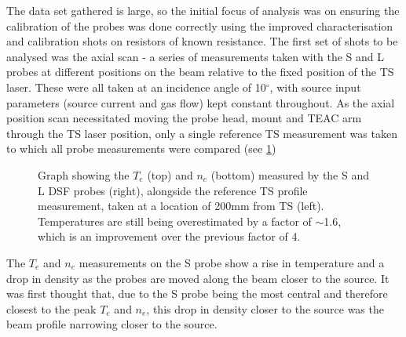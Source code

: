 \documentclass[a4paper, 12pt]{article} %
\begin{document}
	The data set gathered is large, so the initial focus of analysis was on ensuring the calibration of the probes was done correctly using the improved characterisation and calibration shots on resistors of known resistance. 
	The first set of shots to be analysed was the axial scan - a series of measurements taken with the S and L probes at different positions on the beam relative to the fixed position of the TS laser. 
	These were all taken at an incidence angle of 10$^{\circ}$, with source input parameters (source current and gas flow) kept constant throughout. 
	As the axial position scan necessitated moving the probe head, mount and TEAC arm through the TS laser position, only a single reference TS measurement was taken to which all probe measurements were compared (see \cref{fig:mag-axial-scan})
	\begin{figure}[!tb]
		\vspace{-20pt}
		\caption{
			Graph showing the $T_e$ (top) and $n_e$ (bottom) measured by the S and L DSF probes (right), alongside the reference TS profile measurement, taken at a location of 200mm from TS (left).
			Temperatures are still being overestimated by a factor of $\sim$1.6, which is an improvement over the previous factor of 4. 
			}
		\label{fig:mag-axial-scan}
		\vspace{-10pt}
	\end{figure}
	The $T_e$ and $n_e$ measurements on the S probe show a rise in temperature and a drop in density as the probes are moved along the beam closer to the source. 
	It was first thought that, due to the S probe being the most central and therefore closest to the peak $T_e$ and $n_e$, this drop in density closer to the source was the beam profile narrowing closer to the source. 
\end{document}
